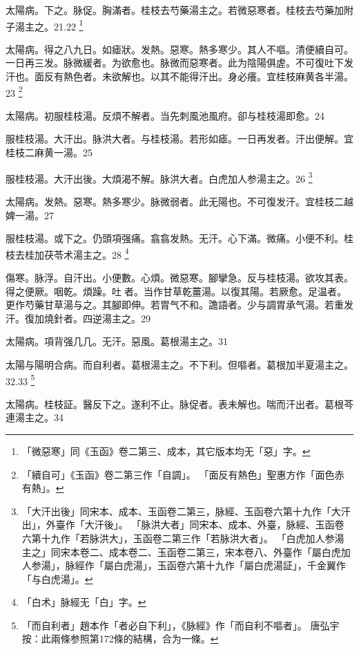 太陽病。下之。脉促。胸滿者。桂枝去芍藥湯主之。若微{\khaaitp 惡}寒者。桂枝去芍藥加附子湯主之。21.22
	\footnote{
		「微惡寒」同《玉函》卷二第三、成本，其它版本均无「惡」字。
	}

太陽病。得之八九日。如瘧狀。发熱。惡寒。熱多寒少。其人不嘔。清便續自可。一日再三发。脉微緩者。为欲愈也。脉微而惡寒者。此为陰陽俱虗。不可復{\khaaitp 吐下}发汗也。面反有熱色者。未欲解也。以其不能得汗出。身必癢。宜桂枝麻黄各半湯。23
	\footnote{
		「續自可」《玉函》卷二第三作「自調」。
		「面反有熱色」聖惠方作「面色赤有熱」。
	}

太陽病。初服桂枝湯。反煩不解者。当先刺風池風府。卻与桂枝湯即愈。24

服桂枝湯。大汗出。脉洪大者。与桂枝湯。若形如瘧。一日再发者。汗出便解。宜桂枝二麻黄一湯。25

%

服桂枝湯。大汗出{\khaaitp 後}。大煩渴不解。脉洪大者。白虎{\khaaitp 加人参}湯主之。26
	\footnote{
		「大汗出後」同宋本、成本、玉函卷二第三，脉經、玉函卷六第十九作「大汗出」，外臺作「大汗後」。
		「脉洪大者」同宋本、成本、外臺，脉經、玉函卷六第十九作「若脉洪大」，玉函卷二第三作「若脉洪大者」。
		「白虎加人参湯主之」同宋本卷二、成本卷二、玉函卷二第三，宋本卷八、外臺作「屬白虎加人参湯」，脉經作「屬白虎湯」，玉函卷六第十九作「屬白虎湯証」，千金翼作「与白虎湯」。
	}

太陽病。发熱。惡寒。熱多寒少。脉微弱者。此无陽也。不可{\khaaitp 復}发汗。{\khaaitp 宜桂枝二越婢一湯。}27

服桂枝湯。{\khaaitp 或}下之。仍頭項强痛。翕翕发熱。无汗。心下滿。微痛。小便不利。桂枝去桂加茯苓术湯主之。28
	\footnote{
		「白术」脉經无「白」字。
	}

傷寒。脉浮。自汗出。小便數。心煩。微惡寒。腳攣急。反与桂枝湯。欲攻其表。得之便厥。咽乾。煩躁。吐{\sungtpii 𠱘}者。当作甘草乾薑湯。以復其陽。若厥愈。足温者。更作芍藥甘草湯与之。其腳即伸。若胃气不和。譫語者。少与{\khaaitp 調胃}承气湯。若重发汗。復加燒針者。四逆湯主之。29

太陽病。項背强几几。无汗。惡風。葛根湯主之。31

太陽与陽明合病。而自利{\khaaitp 者}。葛根湯主之。不下利。但嘔者。葛根加半夏湯主之。32.33
	\footnote{
		「而自利者」趙本作「者必自下利」，《脉經》作「而自利不嘔者」。
		唐弘宇按：此兩條参照第172條的結構，合为一條。
	}

太陽病。桂枝証。醫反下之。遂利不止。脉促者。表未解也。喘而汗出者。葛根芩連湯主之。34

